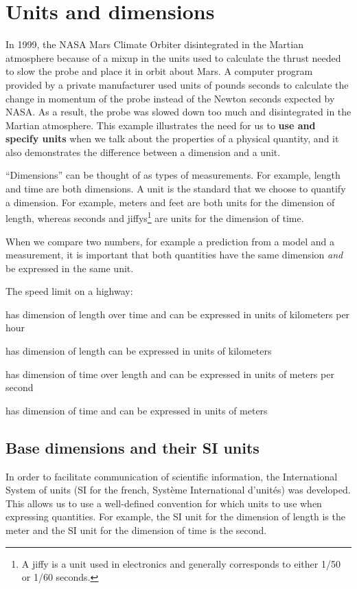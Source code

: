 \section{Units and dimensions}
In 1999, the NASA Mars Climate Orbiter disintegrated in the Martian atmosphere because of a mixup in the units used to calculate the thrust needed to slow the probe and place it in orbit about Mars. A computer program provided by a private manufacturer used units of pounds seconds to calculate the change in momentum of the probe instead of the Newton seconds expected by NASA. As a result, the probe was slowed down too much and disintegrated in the Martian atmosphere. This example illustrates the need for us to \textbf{use and specify units} when we talk about the properties of a physical quantity, and it also demonstrates the difference between a dimension and a unit.

``Dimensions'' can be thought of as types of measurements. For example, length and time are both dimensions. A unit is the standard that we choose to quantify a dimension. For example, meters and feet are both units for the dimension of length, whereas seconds and jiffys\footnote{A jiffy is a unit used in electronics and generally corresponds to either 1/50 or 1/60 seconds.} are units for the dimension of time.

When we compare two numbers, for example a prediction from a model and a measurement, it is important that both quantities have the same dimension \textit{and} be expressed in the same unit.
\begin{checkpointMC}{The speed limit on a highway:}
\item has dimension of length over time and can be expressed in units of kilometers per hour %
\item has dimension of length can be expressed in units of kilometers
\item has dimension of time over length and can be expressed in units of meters per second
\item has dimension of time and can be expressed in units of meters
\end{checkpointMC}

\subsection{Base dimensions and their SI units}
In order to facilitate communication of scientific information, the International System of units (SI for the french, Syst\`eme International d'unit\'es) was developed. This allows us to use a well-defined convention for which units to use when expressing quantities. For example, the SI unit for the dimension of length is the meter and the SI unit for the dimension of time is the second.

